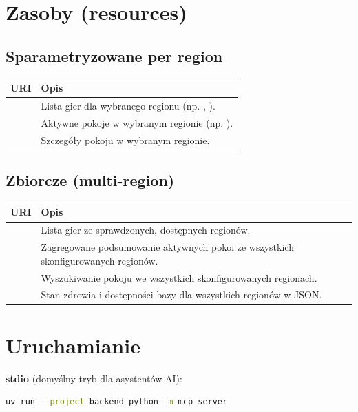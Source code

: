 \section{Zasoby (resources)}
\label{sec:mcp-resources}

\subsection{Sparametryzowane per region}

\begin{tabularx}{\textwidth}{lY}
\toprule
URI & Opis \\
\midrule
{} & Lista gier dla wybranego regionu (np. , ). \\
 & Aktywne pokoje w wybranym regionie (np. ). \\
 & Szczegóły pokoju w wybranym regionie. \\
\bottomrule
\end{tabularx}

\subsection{Zbiorcze (multi-region)}

\begin{tabularx}{\textwidth}{lY}
\toprule
URI & Opis \\
\midrule
{} & Lista gier ze sprawdzonych, dostępnych regionów. \\
 & Zagregowane podsumowanie aktywnych pokoi ze wszystkich skonfigurowanych regionów. \\
 & Wyszukiwanie pokoju we wszystkich skonfigurowanych regionach. \\
 & Stan zdrowia i dostępności bazy dla wszystkich regionów w JSON. \\
\bottomrule
\end{tabularx}

\section{Uruchamianie}
\label{sec:mcp-uruchomienie}

\textbf{stdio} (domyślny tryb dla asystentów AI):

\begin{lstlisting}[language=bash]
uv run --project backend python -m mcp_server
\end{lstlisting}

